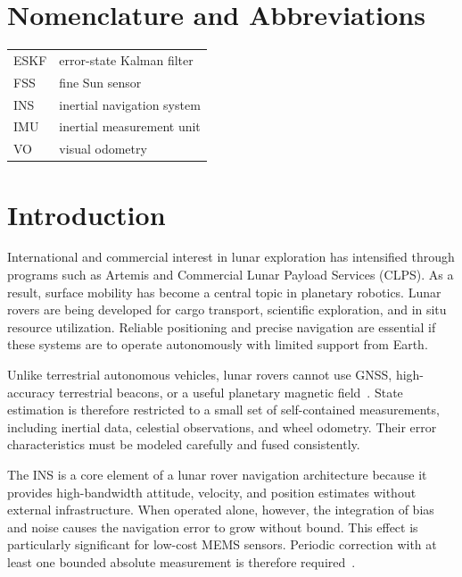 \documentclass[]{IAC_style}
\begin{document}

\maketitle
\thispagestyle{fancy}

\section*{Nomenclature and Abbreviations}
\begin{tabular}{@{}ll@{}}
ESKF & error-state Kalman filter \\
FSS & fine Sun sensor \\
INS & inertial navigation system \\
IMU & inertial measurement unit \\
VO & visual odometry \\
\end{tabular}

\section{Introduction}

International and commercial interest in lunar exploration has intensified through programs such as Artemis and Commercial Lunar Payload Services (CLPS). As a result, surface mobility has become a central topic in planetary robotics. Lunar rovers are being developed for cargo transport, scientific exploration, and in situ resource utilization. Reliable positioning and precise navigation are essential if these systems are to operate autonomously with limited support from Earth.

Unlike terrestrial autonomous vehicles, lunar rovers cannot use GNSS, high-accuracy terrestrial beacons, or a useful planetary magnetic field~\cite{ilyas2016integrated}. State estimation is therefore restricted to a small set of self-contained measurements, including inertial data, celestial observations, and wheel odometry. Their error characteristics must be modeled carefully and fused consistently.

The INS is a core element of a lunar rover navigation architecture because it provides high-bandwidth attitude, velocity, and position estimates without external infrastructure. When operated alone, however, the integration of bias and noise causes the navigation error to grow without bound. This effect is particularly significant for low-cost MEMS sensors. Periodic correction with at least one bounded absolute measurement is therefore required~\cite{titterton2004strapdown,groves2013principles}.
\end{document}
